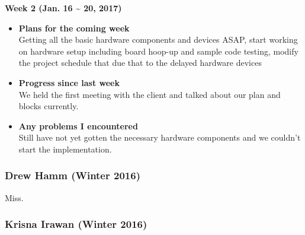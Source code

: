 		
	\begin{center}
		\textbf{Week 2 (Jan. 16 {\textasciitilde{}} 20, 2017)}
	\end{center}
	\begin{itemize}
		\item \textbf{Plans for the coming week}
		\\Getting all the basic hardware components and devices ASAP, start working on hardware setup including board hoop-up and sample code testing, modify the project schedule that due that to the delayed hardware devices\\

		\item \textbf{Progress since last week}
		\\We held the first meeting with the client and talked about our plan and blocks currently.\\

		\item \textbf{Any problems I encountered}
		\\Still have not yet gotten the necessary hardware components and we couldn't start the implementation.\\
	\end{itemize}


\newpage
	\subsubsection{Drew Hamm (Winter 2016)}
	\vspace{0.5cm}
	Miss.

	\subsubsection{Krisna Irawan (Winter 2016)}
	\vspace{0.5cm}

